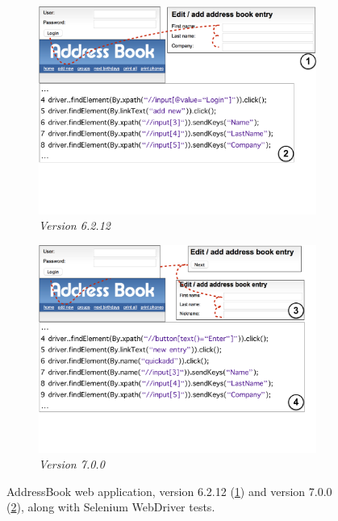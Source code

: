 \begin{figure}[h!]
\centering
\begin{subfigure}{\columnwidth}
\centering
\includegraphics[trim=0cm 6cm 0cm 0cm, clip=true, scale=0.200]{images/addressbook-version1.pdf}
\caption{\emph{Version 6.2.12}}
\label{fig:ab1} 
\end{subfigure}
\begin{subfigure}{\columnwidth}
\centering
\includegraphics[trim=0cm 5cm 1.3cm 0cm, clip=true,  scale=0.190]{images/addressbook-version2.pdf}
\caption{\emph{Version 7.0.0}}
\label{fig:ab2}
\end{subfigure}
\caption{AddressBook web application, version 6.2.12 (\ref{fig:ab1}) and version 7.0.0 (\ref{fig:ab2}), along with Selenium WebDriver tests.} 
\label{fig:example} 
\end{figure}

